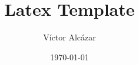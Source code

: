 
\author{Víctor Alcázar}
\title{Latex Template}
\date{\today}

\maketitle
\tableofcontents










